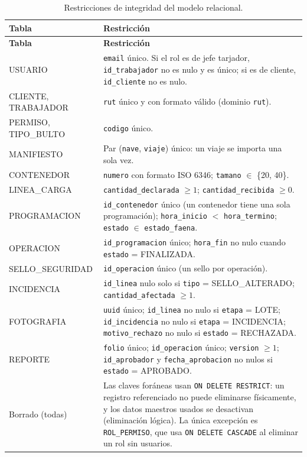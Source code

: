 {\estilotabla
\begin{longtable}{|L{3.4cm}|L{11.2cm}|}
\caption{Restricciones de integridad del modelo relacional.}
\label{tab:restricciones}\\
\hline
{}
\textbf{Tabla} & \textbf{Restricción} \\ \hline
\endfirsthead
\hline
{}
\textbf{Tabla} & \textbf{Restricción} \\ \hline
\endhead
USUARIO & \texttt{email} único. Si el rol es de jefe tarjador, \texttt{id\_trabajador} no
es nulo y es único; si es de cliente, \texttt{id\_cliente} no es nulo. \\ \hline
CLIENTE, TRABAJADOR & \texttt{rut} único y con formato válido (dominio \texttt{rut}). \\
\hline
PERMISO, TIPO\_BULTO & \texttt{codigo} único. \\ \hline
MANIFIESTO & Par (\texttt{nave}, \texttt{viaje}) único: un viaje se importa una sola vez. \\
\hline
CONTENEDOR & \texttt{numero} con formato ISO 6346; \texttt{tamano} $\in$ \{20, 40\}. \\
\hline
LINEA\_CARGA & \texttt{cantidad\_declarada} $\geq 1$; \texttt{cantidad\_recibida}
$\geq 0$. \\ \hline
PROGRAMACION & \texttt{id\_contenedor} único (un contenedor tiene una sola programación);
\texttt{hora\_inicio} $<$ \texttt{hora\_termino}; \texttt{estado} $\in$
\texttt{estado\_faena}. \\ \hline
OPERACION & \texttt{id\_programacion} único; \texttt{hora\_fin} no nulo cuando
\texttt{estado} = FINALIZADA. \\ \hline
SELLO\_SEGURIDAD & \texttt{id\_operacion} único (un sello por operación). \\ \hline
INCIDENCIA & \texttt{id\_linea} nulo solo si \texttt{tipo} = SELLO\_ALTERADO;
\texttt{cantidad\_afectada} $\geq 1$. \\ \hline
FOTOGRAFIA & \texttt{uuid} único; \texttt{id\_linea} no nulo si \texttt{etapa} = LOTE;
\texttt{id\_incidencia} no nulo si \texttt{etapa} = INCIDENCIA;
\texttt{motivo\_rechazo} no nulo si \texttt{estado} = RECHAZADA. \\ \hline
REPORTE & \texttt{folio} único; \texttt{id\_operacion} único; \texttt{version} $\geq 1$;
\texttt{id\_aprobador} y \texttt{fecha\_aprobacion} no nulos si \texttt{estado} =
APROBADO. \\ \hline
Borrado (todas) & Las claves foráneas usan \texttt{ON DELETE RESTRICT}: un registro
referenciado no puede eliminarse físicamente, y los datos maestros usados se desactivan
(eliminación lógica). La única excepción es \texttt{ROL\_PERMISO}, que usa \texttt{ON
DELETE CASCADE} al eliminar un rol sin usuarios. \\ \hline
\end{longtable}
}
